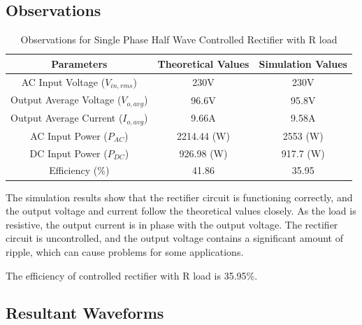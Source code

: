 \subsection{Observations}

\begin{table}[h]
    \renewcommand{\arraystretch}{1.3}
    \label{table_observation_5}
    \centering
    \begin{tabular}{|c|c|c|}
        \hline
        Parameters                              & Theoretical Values & Simulation Values \\
        \hline
        \hline
        AC Input Voltage ($ V_{in,rms} $)       & 230V               & 230V             \\
        \hline
        Output Average Voltage ($ V_{o,avg} $)  & 96.6V              & 95.8V            \\
        \hline
        Output Average Current ($ I_{o,avg}  $) & 9.66A              & 9.58A            \\
        \hline
        AC Input Power ($ P_{AC}  $)            & 2214.44 (W)        & 2553 (W)         \\
        \hline
        DC Input Power ($ P_{DC}  $)            & 926.98 (W)         & 917.7 (W)        \\
        \hline
        Efficiency (\%)                         & 41.86              & 35.95             \\
        \hline
    \end{tabular}
    \caption{Observations for Single Phase Half Wave Controlled Rectifier with R load}

\end{table}


The simulation results show that the rectifier circuit is functioning correctly, and the output voltage and current follow the theoretical values closely. As the load is resistive, the output current is in phase with the output voltage. The rectifier circuit is uncontrolled, and the output voltage contains a significant amount of ripple, which can cause problems for some applications.

The efficiency of controlled rectifier with R load is 35.95\%.

\pagebreak


\subsection{Resultant Waveforms}

